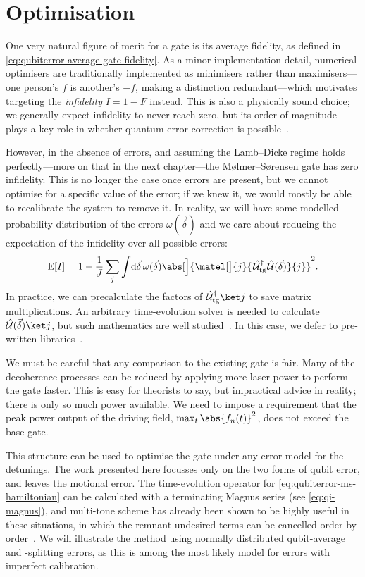 \section{Optimisation}

One very natural figure of merit for a gate is its average fidelity, as defined in \cref{eq:qubiterror-average-gate-fidelity}.
As a minor implementation detail, numerical optimisers are traditionally implemented as minimisers rather than maximisers---one person's $f$ is another's $-f$, making a distinction redundant---which motivates targeting the \emph{infidelity} $I = 1 - F$ instead.
This is also a physically sound choice; we generally expect infidelity to never reach zero, but its order of magnitude plays a key role in whether quantum error correction is possible~\cite{Knill2005}.

However, in the absence of errors, and assuming the Lamb--Dicke regime holds perfectly---more on that in the next chapter---the M\o lmer--S\o rensen gate has zero infidelity.
This is no longer the case once errors are present, but we cannot optimise for a specific value of the error; if we knew it, we would mostly be able to recalibrate the system to remove it.
In reality, we will have some modelled probability distribution of the errors $\omega(\vec\delta)$ and we care about reducing the expectation of the infidelity over all possible errors:
\begin{equation}\label{eq:qubiterror-figure-of-merit}
\expect{I}
    = 1 - \frac1J\sum_j\int\!\mathrm d\vec\delta\,\omega(\vec\delta) \abs[\Big]{\matel[\big]{j}{\mkern2mu\U_{\text{tg}}^\dagger\mkern1mu\U(\vec\delta)}{j}}^2.
\end{equation}
In practice, we can precalculate the factors of $\U_{\text{tg}}^\dagger\ket j$ to save matrix multiplications.
An arbitrary time-evolution solver is needed to calculate $\U(\vec\delta)\ket j$, but such mathematics are well studied~\cite{Press2007}.
In this case, we defer to pre-written libraries~\cite{Johansson2013,Virtanen2020}.

We must be careful that any comparison to the existing gate is fair.
Many of the decoherence processes can be reduced by applying more laser power to perform the gate faster.
This is easy for theorists to say, but impractical advice in reality; there is only so much power available.
We need to impose a requirement that the peak power output of the driving field, $\max_t \abs{f_n(t)}^2$, does not exceed the base gate.

This structure can be used to optimise the gate under any error model for the detunings.
The work presented here focusses only on the two forms of qubit error, and leaves the motional error.
The time-evolution operator for \cref{eq:qubiterror-ms-hamiltonian} can be calculated with a terminating Magnus series (see \cref{eq:qi-magnus}), and multi-tone scheme has already been shown to be highly useful in these situations, in which the remnant undesired terms can be cancelled order by order~\cite{Haddadfarshi2016,Webb2018,Shapira2018}.
We will illustrate the method using normally distributed qubit-average and -splitting errors, as this is among the most likely model for errors with imperfect calibration.


